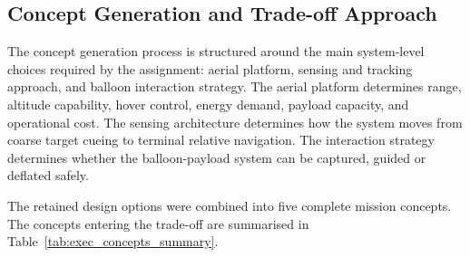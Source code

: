 

\subsection*{Concept Generation and Trade-off Approach}




The concept generation process is structured around the main system-level choices required by the assignment: aerial platform, sensing and tracking approach, and balloon interaction strategy. The aerial platform determines range, altitude capability, hover control, energy demand, payload capacity, and operational cost. The sensing architecture determines how the system moves from coarse target cueing to terminal relative navigation. The interaction strategy determines whether the balloon-payload system can be captured, guided or deflated safely.

The retained design options were combined into five complete mission concepts. The concepts entering the trade-off are summarised in Table~\ref{tab:exec_concepts_summary}.

